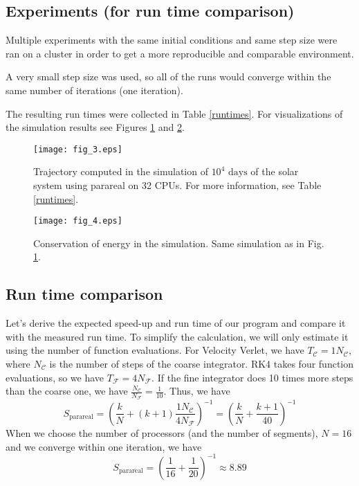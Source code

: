 \documentclass[conference]{IEEEtran}
\begin{document}
\subsection{Experiments (for run time comparison)}
Multiple experiments with the same initial conditions and same step size were ran on a cluster in order to get a more reproducible and comparable environment. 

A very small step size was used, so all of the runs would converge within the same number of iterations (one iteration).

The resulting run times were collected in Table \ref{runtimes}. For visualizations of the simulation results see Figures \ref{sim} and \ref{energy}.

\begin{figure}[htbp]
\centerline{\texttt{[image: fig\_3.eps]}}
\caption{Trajectory computed in the simulation of $10^4\text{ days}$ of the solar system using parareal on 32 CPUs. For more information, see Table \ref{runtimes}.}
\label{sim}
\end{figure}

\begin{figure}[htbp]
\centerline{\texttt{[image: fig\_4.eps]}}
\caption{Conservation of energy in the simulation. Same simulation as in Fig. \ref{sim}.}
\label{energy}
\end{figure}

\subsection{Run time comparison}
Let's derive the expected speed-up and run time of our program and compare it with the measured run time. To simplify the calculation, we will only estimate it using the number of function evaluations. For Velocity Verlet, we have $T_\mathcal{C} = 1N_\mathcal{C}$, where $N_\mathcal{C}$ is the number of steps of the coarse integrator. RK4 takes four function evaluations, so we have $T_\mathcal{F} = 4N_\mathcal{F}$. If the fine integrator does 10 times more steps than the coarse one, we have $\frac{N_\mathcal{C}}{N_\mathcal{F}} = \frac{1}{10}$. Thus, we have
$$
S_\text{parareal} = \left(\frac{k}{N} + (k+1)\frac{1N_\mathcal{C}}{4N_\mathcal{F}}\right)^{-1} = \left(\frac{k}{N} + \frac{k+1}{40}\right)^{-1}
$$
When we choose the number of processors (and the number of segments), $N = 16$ and we converge within one iteration, we have
$$
S_\text{parareal} = \left(\frac{1}{16} + \frac{1}{20}\right)^{-1} \approx 8.89
$$
\end{document}
